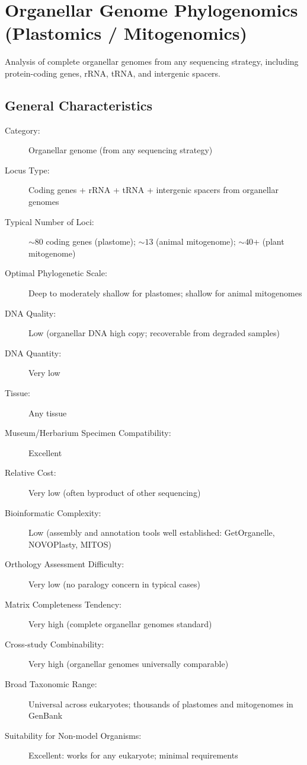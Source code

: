 \textcite{straub2012, dodsworth2015, weitemier2014}

\section{Organellar Genome Phylogenomics (Plastomics / Mitogenomics)}

Analysis of complete organellar genomes from any sequencing strategy, including protein-coding genes, rRNA, tRNA, and intergenic spacers.

\subsection{General Characteristics}

\begin{description}
\item[Category:] Organellar genome (from any sequencing strategy)
\item[Locus Type:] Coding genes + rRNA + tRNA + intergenic spacers from organellar genomes
\item[Typical Number of Loci:] \(\sim 80\) coding genes (plastome); \(\sim 13\) (animal mitogenome); \(\sim 40\)+ (plant mitogenome)
\item[Optimal Phylogenetic Scale:] Deep to moderately shallow for plastomes; shallow for animal mitogenomes
\item[DNA Quality:] Low (organellar DNA high copy; recoverable from degraded samples)
\item[DNA Quantity:] Very low
\item[Tissue:] Any tissue
\item[Museum/Herbarium Specimen Compatibility:] Excellent
\item[Relative Cost:] Very low (often byproduct of other sequencing)
\item[Bioinformatic Complexity:] Low (assembly and annotation tools well established: GetOrganelle, NOVOPlasty, MITOS)
\item[Orthology Assessment Difficulty:] Very low (no paralogy concern in typical cases)
\item[Matrix Completeness Tendency:] Very high (complete organellar genomes standard)
\item[Cross-study Combinability:] Very high (organellar genomes universally comparable)
\item[Broad Taxonomic Range:] Universal across eukaryotes; thousands of plastomes and mitogenomes in GenBank
\item[Suitability for Non-model Organisms:] Excellent: works for any eukaryote; minimal requirements
\end{description}


